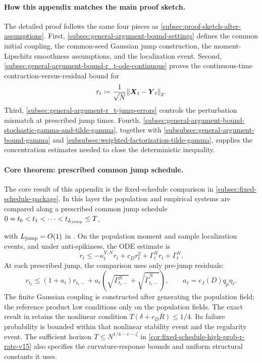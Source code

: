 \paragraph{How this appendix matches the main proof sketch.}
The detailed proof follows the same four pieces as
\cref{subsec:proof-sketch-after-assumptions}.
First, \cref{subsec:general-argument-bound-settings} defines the common initial coupling, the common-seed Gaussian
jump construction, the moment-Lipschitz smoothness assumptions, and the
localization event.  Second,
\cref{subsec:general-argument-bound-r_t-ode-continuous} proves the continuous-time contraction-versus-residual bound for
\[
    r_t
    \coloneq
    \frac1{\sqrt N}\norm{\boldsymbol{X}_t-\boldsymbol{Y}_t}_2 .
\]
Third, \cref{subsec:general-argument-r_t-jump-errors} controls the perturbation mismatch at prescribed jump times.  Fourth,
\cref{subsec:general-argument-bound-stochastic-gamma-and-tilde-gamma}, together with
\cref{subsubsec:general-argument-bound-gamma} and
\cref{subsubsec:weighted-factorization-tilde-gamma}, supplies the concentration estimates needed to
close the deterministic inequality.

\paragraph{Core theorem: prescribed common jump schedule.}
The core result of this appendix is the fixed-schedule comparison in
\cref{subsec:fixed-schedule-package}.  In this
layer the population and empirical systems are compared along a prescribed
common jump schedule
\(
0=t_0<t_1<\cdots<t_{L_{\mathrm{jump}}}\le T
\),

with $L_{\mathrm{jump}}=O(1)$ in
. On the population moment
and sample localization events, and under anti-spikiness, the ODE estimate is
\[
\dot r_t\le-\kappa_t^{Y,N}r_t+c_Dr_t^2+\Gamma_t^Nr_t+\Gamma_t^N.
\]
At each prescribed jump, the comparison uses only pre-jump residuals:
\[
r_{t_\ell}\le(1+a_\ell)r_{t_\ell-}
+a_\ell(\sqrt{\Gamma_{t_\ell-}^N}+\sqrt{\widetilde\Gamma_{t_\ell-}^N}),
\qquad a_\ell=c_J(D)q_p\eta_\ell.
\]
The finite Gaussian coupling is constructed after generating the population
field; the reference product law conditions only on the population fields.
The exact result in  retains the
nonlinear condition $T(\delta+c_DR)\le1/4$. Its failure probability is bounded
within that nonlinear stability event and the regularity event. The sufficient horizon
$T\le N^{1/4-\upsilon-\zeta}$ in \cref{cor:fixed-schedule-high-prob-r-rate-v15}
also specifies the curvature-response bounds and uniform structural constants it uses.

